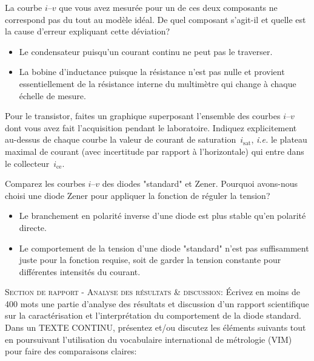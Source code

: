 \documentclass[canadien,12pt,oneside,letterpaper]{article}
\begin{document}
\begin{gradescope}[resume]
    \item La courbe $i$--$v$ que vous avez mesurée pour un de ces deux composants ne correspond pas du tout au modèle idéal. De quel composant s'agit-il et quelle est la cause d'erreur expliquant cette déviation?
    \begin{itemize}[label=$\blacktriangleright$]
            \item Le condensateur puisqu'un courant continu ne peut pas le traverser.
            \item La bobine d'inductance puisque la résistance n'est pas nulle et provient essentiellement de la résistance interne du multimètre qui change à chaque échelle de mesure.
    \end{itemize}
    \item Pour le transistor, faites un graphique superposant l'ensemble des courbes $i$--$v$ dont vous avez fait l'acquisition pendant le laboratoire. Indiquez explicitement au-dessus de chaque courbe la valeur de courant de saturation~$i_{\mathrm{sat}}$, \textit{i.e.} le plateau maximal de courant (avec incertitude par rapport à l'horizontale) qui entre dans le collecteur~$i_{\mathrm{ce}}$. %
    \item Comparez les courbes $i$--$v$ des diodes "standard" et Zener. Pourquoi avons-nous choisi une diode Zener pour appliquer la fonction de réguler la tension?
    \begin{itemize}[label=$\blacktriangleright$]
    \item Le branchement en polarité inverse d'une diode est plus stable qu'en polarité directe.
    \item Le comportement de la tension d'une diode "standard" n'est pas suffisamment juste pour la fonction requise, soit de garder la tension constante pour différentes intensités du courant.
    \end{itemize}
    \item \textsc{Section de rapport - Analyse des résultats \& discussion:} Écrivez en moins de 400 mots une partie d'analyse des résultats et discussion d'un rapport scientifique sur la caractérisation et l'interprétation du comportement de la diode standard. Dans un TEXTE CONTINU, présentez et/ou discutez les éléments suivants tout en poursuivant l'utilisation du vocabulaire international de métrologie (VIM) pour faire des comparaisons claires:

\end{gradescope}
\end{document}
